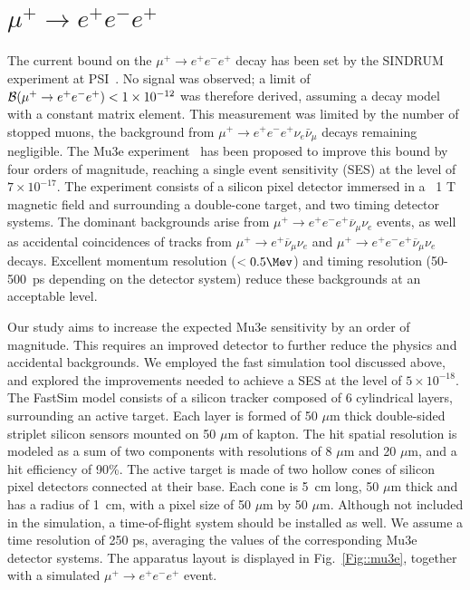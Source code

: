 \section{$\mu^+\to e^+e^-e^+$}
\label{mutoeee}

The current bound on the $\mu^+\to e^+e^-e^+$ decay has been set by the SINDRUM experiment at PSI~\cite{Bellgardt:1987du}. No signal was observed; a limit of ${\cal B}(\mu^+\to e^+e^-e^+) < 1\times 10^{-12}$ was therefore derived, assuming a decay model with a constant matrix element. This measurement was limited by the number of stopped muons, the background from $\mu^+\to e^+e^-e^+ \nu_e \bar\nu_\mu$ decays remaining negligible. The Mu3e experiment~\cite{Blondel:2013ia} has been proposed to improve this bound by four orders of magnitude, reaching a single event sensitivity (SES) at the level of $7 \times 10^{-17}$. The experiment consists of a silicon pixel detector immersed in a ~1 T magnetic field and surrounding a double-cone target, and two timing detector systems. The dominant backgrounds arise from $\mu^+ \rightarrow e^+e^-e^+ \overline{\nu}_{\mu} \nu_e$ events, as well as accidental coincidences of tracks from $\mu^+ \rightarrow e^+ \overline{\nu}_{\mu} \nu_e$ and $\mu^+ \rightarrow e^+e^-e^+ \overline{\nu}_{\mu} \nu_e$ decays. Excellent momentum resolution ($<0.5 \Mev$) and timing resolution (50-500~ps depending on the detector system) reduce these backgrounds at an acceptable level.

Our study aims to increase the expected Mu3e sensitivity by an order of magnitude. This requires an improved detector to further reduce the physics and accidental backgrounds. We employed the fast simulation tool discussed above, and explored the improvements needed to achieve a SES at the level of $5 \times 10^{-18}$. The FastSim model consists of a silicon tracker composed of 6 cylindrical layers, surrounding an active target. Each layer is formed of 50 $\mu$m thick double-sided striplet silicon sensors mounted on 50 $\mu$m of kapton. The hit spatial resolution is modeled as a sum of two components with resolutions of 8 $\mu$m and 20 $\mu$m, and a hit efficiency of 90\%. The active target is made of two hollow cones of silicon pixel detectors connected at their base. Each cone is 5~cm long, 50 $\mu$m thick and has a radius of 1~cm, with a pixel size of 50 $\mu$m by 50 $\mu$m. Although not included in the simulation, a time-of-flight system should be installed as well. We assume a time resolution of 250 ps, averaging the values of the corresponding Mu3e detector systems. The apparatus layout is displayed in Fig.~\ref{Fig::mu3e}, together with a simulated $\mu^+ \rightarrow e^+e^-e^+$ event.

